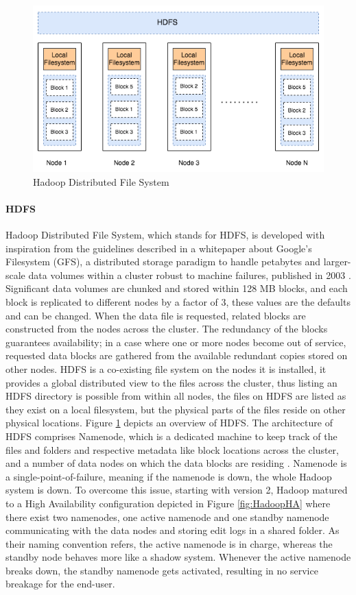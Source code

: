 \documentclass[review]{elsarticle}
\begin{document}
\begin{figure}[h!]
	\caption{Hadoop Distributed File System}
	\label{fig:HDFSoverview}
	\includegraphics[width=\textwidth]{HDFSoverview}
	\centering
\end{figure}

\paragraph{HDFS}Hadoop Distributed File System, which stands for HDFS, is developed with inspiration from the guidelines described in a whitepaper about Google's Filesystem (GFS), a distributed storage paradigm to handle petabytes and larger-scale data volumes within a cluster robust to machine failures, published in 2003 \cite{ghemawat_google_2003}. Significant data volumes are chunked and stored within 128 MB blocks, and each block is replicated to different nodes by a factor of 3, these values are the defaults and can be changed. When the data file is requested, related blocks are constructed from the nodes across the cluster. The redundancy of the blocks guarantees availability; in a case where one or more nodes become out of service, requested data blocks are gathered from the available redundant copies stored on other nodes. HDFS is a co-existing file system on the nodes it is installed, it provides a global distributed view to the files across the cluster, thus listing an HDFS directory is possible from within all nodes, the files on HDFS are listed as they exist on a local filesystem, but the physical parts of the files reside on other physical locations. Figure \ref{fig:HDFSoverview} depicts an overview of HDFS. The architecture of HDFS comprises Namenode, which is a dedicated machine to keep track of the files and folders and respective metadata like block locations across the cluster, and a number of data nodes on which the data blocks are residing \cite{white_hadoop_2015}. Namenode is a single-point-of-failure, meaning if the namenode is down, the whole Hadoop system is down. To overcome this issue, starting with version 2, Hadoop matured to a High Availability configuration depicted in Figure \ref{fig:HadoopHA} where there exist two namenodes, one active namenode and one standby namenode communicating with the data nodes and storing edit logs in a shared folder. As their naming convention refers, the active namenode is in charge, whereas the standby node behaves more like a shadow system. Whenever the active namenode breaks down, the standby namenode gets activated, resulting in no service breakage for the end-user.
\end{document}
